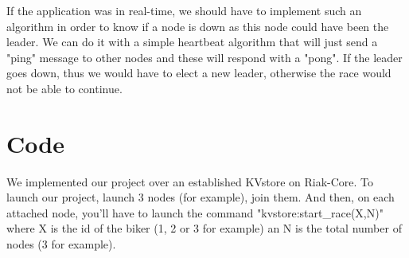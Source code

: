 \documentclass[a4paper, 11pt]{article}
\begin{document}
If the application was in real-time, we should have to implement such an algorithm in order to know if a node is down as this node could have been the leader.
We can do it with a simple heartbeat algorithm that will just send a "ping" message to other nodes and these will respond with a "pong".
If the leader goes down, thus we would have to elect a new leader, otherwise the race would not be able to continue.

\section{Code}


We implemented our project over an established KVstore on Riak-Core.
To launch our project, launch 3 nodes (for example), join them.
And then, on each attached node, you'll have to launch the command "kvstore:start\_race(X,N)" where X is the id of the biker (1, 2 or 3 for example) an N is the total number of nodes (3 for example).
\end{document}
